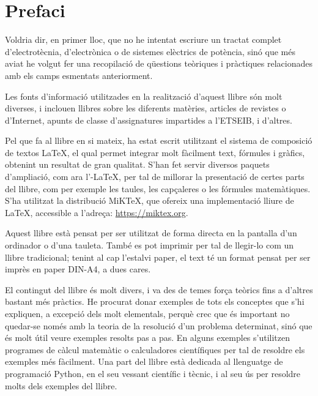 \chapter*{Prefaci} 

   Voldria dir, en primer lloc, que no he intentat escriure un tractat complet
   d'electrotècnia, d'electrònica o de sistemes elèctrics de potència, sinó que més aviat
   he volgut
   fer una recopilació de qüestions teòriques i pràctiques relacionades amb els camps esmentats
   anteriorment.

   Les fonts d'informació utilitzades en la realització d'aquest llibre són molt diverses,
   i inclouen llibres sobre les diferents matèries, articles de revistes o d'Internet,
   apunts de classe d'assignatures impartides a l'ETSEIB, i d'altres.

   Pel que fa al llibre en si mateix, ha estat escrit utilitzant el sistema de composició de
   textos \LaTeX, el qual
   permet integrar molt fàcilment text, fórmules i gràfics, obtenint un resultat de
   gran qualitat. S'han fet servir diversos paquets d'ampliació, com ara
   l'\AmS-\LaTeX,
   per tal de millorar la presentació de certes parts del
   llibre, com per exemple les taules, les capçaleres o les fórmules matemàtiques. S'ha utilitzat la distribució MiK\TeX, que ofereix una implementació lliure de \LaTeX{}, accessible a l'adreça: \href{https://miktex.org/}{https:/\!\!/miktex.org}.

   Aquest llibre està pensat per  ser utilitzat  de forma directa en la pantalla d'un
   ordinador o d'una tauleta. També es pot imprimir per tal de llegir-lo com un llibre tradicional;  tenint al cap l'estalvi paper, el text
   té un format pensat per  ser imprès en paper DIN-A4, a dues cares.

    El contingut del llibre és molt divers, i va des de temes força teòrics fins a
    d'altres bastant més pràctics. He procurat donar exemples de tots els conceptes
    que s'hi expliquen, a excepció dels molt elementals, perquè crec que és important
     no quedar-se només amb la teoria de  la resolució d'un problema determinat, sinó que
     és molt útil veure exemples resolts pas a pas. En alguns exemples s'utilitzen programes de càlcul matemàtic o calculadores científiques per tal de resoldre els exemples més fàcilment. Una part  del llibre està dedicada al llenguatge de programació Python, en el seu vessant científic i tècnic, i al seu ús  per resoldre molts dels exemples del llibre.
     
